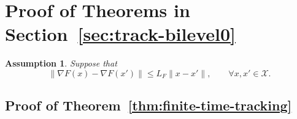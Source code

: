 \documentclass{article}
\newtheorem{theorem}{Theorem}[section]
\newtheorem{assumption}[theorem]{Assumption}
\newcommand{\1}{\mathbf{1}}
\begin{document}
\section{Proof of Theorems in Section~\ref{sec:track-bilevel0}}\label{sec:track-bilevel}

\begin{assumption}\label{ass:7}
Suppose that
\[
\|\nabla F(x)-\nabla F(x')\|
\le
L_F\|x-x'\|,
\qquad
\forall x,x'\in\mathcal X.
\]
\end{assumption}

\subsection{Proof of Theorem~\ref{thm:finite-time-tracking}}
\end{document}
